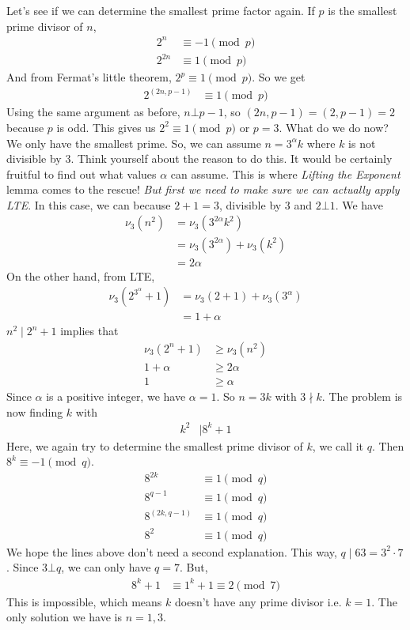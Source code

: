 \documentclass[problems.tex]{subfile}
\begin{document}
	\begin{solution}
		Let's see if we can determine the smallest prime factor again. If $p$ is the smallest prime divisor of $n$,
			\begin{align*}
				2^n &\equiv-1\pmod p\\
				2^{2n} &\equiv1\pmod p
			\end{align*}
		And from Fermat's little theorem, $2^p\equiv1\pmod p$. So we get
			\begin{align*}
				2^{(2n,p-1)} &\equiv1\pmod p
			\end{align*}
		Using the same argument as before, $n\bot p-1$, so $(2n,p-1)=(2,p-1)=2$ because $p$ is odd. This gives us $2^2\equiv1\pmod p$ or $p=3$. What do we do now? We only have the smallest prime. So, we can assume $n=3^\alpha k$ where $k$ is not divisible by $3$. Think yourself about the reason to do this. It would be certainly fruitful to find out what values $\alpha$ can assume. This is where \textit{Lifting the Exponent} lemma comes to the rescue! \textit{But first we need to make sure we can actually apply LTE}. In this case, we can because $2+1=3$, divisible by $3$ and $2\bot1$. We have
			\begin{align*}
				\nu_3(n^2)  & = \nu_3(3^{2\alpha }k^2)\\
							& = \nu_3(3^{2\alpha })+\nu_3(k^2)\\
							& = 2\alpha
			\end{align*}
		On the other hand, from LTE,
			\begin{align*}
				\nu_3(2^{3^\alpha}+1)  & = \nu_3(2+1)+\nu_3(3^\alpha )\\
									& = 1+\alpha
			\end{align*}
		$n^2\mid 2^n+1$ implies that
			\begin{align*}
				\nu_3(2^n+1) & \geq\nu_3(n^2)\\
				1+\alpha & \geq2\alpha\\
				1 & \geq\alpha
			\end{align*}
		Since $\alpha $ is a positive integer, we have $\alpha = 1$. So $n=3k$ with $3\nmid k$. The problem is now finding $k$ with
			\begin{align*}
				k^2 & \mid  8^k+1
			\end{align*}
		Here, we again try to determine the smallest prime divisor of $k$, we call it $q$. Then $8^k\equiv-1\pmod q$.
			\begin{align*}
				8^{2k} &\equiv1\pmod q\\
				8^{q-1}&\equiv1\pmod q\\
				8^{(2k,q-1)}&\equiv1\pmod q\\
				8^{2}&\equiv1\pmod q
			\end{align*}
		We hope the lines above don't need a second explanation. This way, $q\mid 63=3^2\cdot7$. Since $3\bot q$, we can only have $q=7$. But,
			\begin{align*}
				8^k+1 &\equiv1^k+1\equiv2\pmod7
			\end{align*}
		This is impossible, which means $k$ doesn't have any prime divisor i.e. $k=1$. The only solution we have is $n=1,3$.
	\end{solution}
\end{document}
